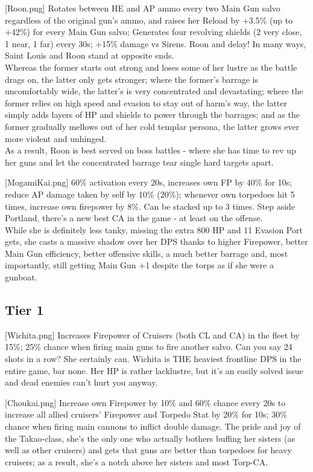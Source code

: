 [Roon.png]
{Rotates between HE and AP ammo every two Main Gun salvo regardless of the original gun's ammo, and raises her Reload by +3.5\% (up to +42\%) for every Main Gun salvo; Generates four revolving shields (2 very close, 1 near, 1 far)  every 30s; +15\% damage vs Sirens.}
{Roon and delay!}
{In many ways, Saint Louis and Roon stand at opposite ends. \\
Whereas the former starts out strong and loses some of her lustre as the battle drags on, the latter only gets stronger; where the former's barrage is uncomfortably wide, the latter's is very concentrated and devastating; where the former relies on high speed and evasion to stay out of harm's way, the latter simply adds layers of HP and shields to power through the barrages; and as the former gradually mellows out of her cold templar persona, the latter grows ever more violent and unhinged.\\
As a result, Roon is best served on boss battles - where she has time to rev up her guns and let the concentrated barrage tear single hard targets apart.}

[MogamiKai.png]
{60\% activation every 20s, increases own FP by 40\% for 10s; reduce AP damage taken by self by 10\% (20\%); whenever own torpedoes hit 5 times, increase own firepower by 8\%. Can be stacked up to 3 times.}
{}
{Step aside Portland, there's a new best CA in the game - at least on the offense.\\
While she is definitely less tanky, missing the extra 800 HP and 11 Evasion Port gets, she casts a massive shadow over her DPS thanks to higher Firepower, better Main Gun efficiency, better offensive skills, a much better barrage and, most importantly, still getting Main Gun +1 despite the torps as if she were a gunboat.}
 
 
\newpage
\subsection{Tier 1}
[Wichita.png]
{Increases Firepower of Cruisers (both CL and CA) in the fleet by 15\%; 25\% chance when firing main guns to fire another salvo.}
{}
{Can you say 24 shots in a row? She certainly can. Wichita is THE heaviest frontline DPS in the entire game, bar none. Her HP is rather lacklustre, but it's an easily solved issue and dead enemies can't hurt you anyway.}

[Choukai.png]
{Increase own Firepower by 10\% and 60\% chance every 20s to increase all allied cruisers' Firepower and Torpedo Stat by 20\% for 10s; 30\% chance when firing main cannons to inflict double damage.}
{}
{The pride and joy of the Takao-class, she's the only one who actually bothers buffing her sisters (as well as other cruisers) and gets that guns are better than torpedoes for heavy cruisers; as a result, she's a notch above her sisters and most Torp-CA.}
 
